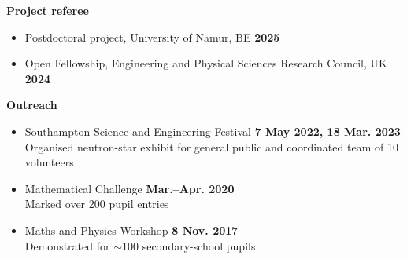 \documentclass[%
    margin,
    line,
]{res}
\begin{document}
\begin{resume}
\textbf{Project referee}
\vspace*{.05in}
\begin{itemize}
    \item[] Postdoctoral project, University of Namur, BE \hfill \textbf{2025}
    \item[] Open Fellowship,
    Engineering and Physical Sciences Research Council, UK \hfill \textbf{2024}
\end{itemize}

\textbf{Outreach}
\vspace*{.05in}
\begin{itemize}
    \item[] Southampton Science and Engineering Festival
    \hfill \textbf{7 May 2022, 18 Mar. 2023} \\
    \hspace*{1em} Organised neutron-star exhibit for general public and
    coordinated team of 10 volunteers
    \item[] Mathematical Challenge \hfill \textbf{Mar.--Apr. 2020} \\
    \hspace*{1em} Marked over 200 pupil entries
    \item[] Maths and Physics Workshop \hfill \textbf{8 Nov. 2017} \\
    \hspace*{1em} Demonstrated for $\sim 100$ secondary-school pupils
\end{itemize}


\end{resume}
\end{document}
